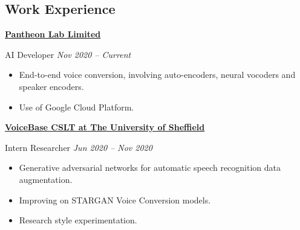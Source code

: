 \documentclass[10pt]{article} %
\begin{document}
\begin{changemargin}{0pt}{0.5pt} %

\begin{minipage}[t]{0.5\textwidth} %
\vspace{0pt} %


\section{Work Experience}

\begin{changemargin}{5pt}{5pt}

\vspace{5pt}
\underline{\textbf{Pantheon Lab Limited}}\\
\par
\vspace{-10pt}
AI Developer \hfill \textit{Nov 2020 -- Current}\\
\vspace{-10pt}

\begin{itemize} \itemsep-2pt %
	\item End-to-end voice conversion, involving auto-encoders, neural vocoders  and speaker encoders.
	\item Use of Google Cloud Platform.
\end{itemize}
	

\vspace{5pt}
\underline{\textbf{VoiceBase CSLT at The University of Sheffield}}\\
\par
\vspace{-10pt}
Intern Researcher \hfill \textit{Jun 2020 -- Nov 2020}\\
\vspace{-10pt}

\begin{itemize} \itemsep-2pt %
  \item Generative adversarial networks for automatic speech recognition data augmentation.
  \item Improving on STARGAN Voice Conversion models.
  \item Research style experimentation.
\end{itemize}


\end{changemargin}
\end{minipage}
\end{changemargin}
\end{document}
